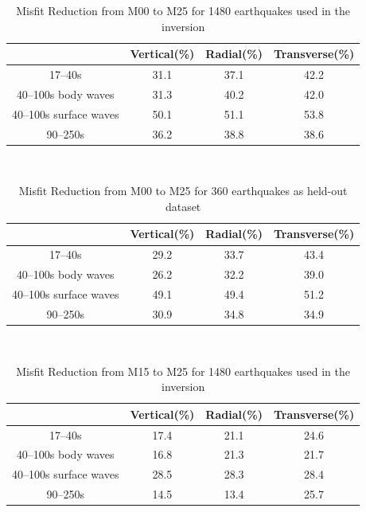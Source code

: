 \documentclass[extra,mreferee]{gji}
\begin{document}
\begin{table}[!htb]
  \centering
  \caption{Misfit Reduction from M00 to M25 for 1480 earthquakes used in the inversion}
  \label{tab:category}
  \begin{tabular}{|c|c|c|c|}
    \hline
     ~          &  Vertical(\%) & Radial(\%) &  Transverse(\%) \\
    \hline
    17--40s                &    31.1    &       37.1 &       42.2 \\
    40--100s body waves    &    31.3    &       40.2 &       42.0 \\
    40--100s surface waves &    50.1    &       51.1 &       53.8 \\
    90--250s               &    36.2    &       38.8 &       38.6 \\
    \hline
  \end{tabular}\\
  \label{table:categories}
\end{table}

\begin{table}[!htb]
  \centering
  \caption{Misfit Reduction from M00 to M25 for 360 earthquakes as held-out dataset}
  \label{tab:category}
  \begin{tabular}{|c|c|c|c|}
    \hline
    ~          &  Vertical(\%) & Radial(\%) &  Transverse(\%) \\
    \hline
    17--40s                &         29.2 &       33.7 &       43.4 \\
    40--100s body waves    &         26.2 &       32.2 &       39.0 \\
    40--100s surface waves &         49.1 &       49.4 &       51.2 \\
    90--250s               &         30.9 &       34.8 &       34.9 \\
    \hline
  \end{tabular}\\
  \label{table:misfit_reduction_M00_M25_360}
\end{table}

\begin{table}[!htb]
  \centering
  \caption{Misfit Reduction from M15 to M25 for 1480 earthquakes used in the inversion}
  \label{tab:category}
  \begin{tabular}{|c|c|c|c|}
    \hline
    ~          &  Vertical(\%) & Radial(\%) &  Transverse(\%) \\
    \hline
    17--40s                &   17.4   &       21.1 &       24.6 \\
    40--100s body waves    &   16.8   &       21.3 &       21.7 \\
    40--100s surface waves &   28.5   &       28.3 &       28.4 \\
    90--250s               &   14.5   &       13.4 &       25.7 \\
    \hline
  \end{tabular}\\
  \label{table:misfit_reduction_M15_M25}
\end{table}
\end{document}
